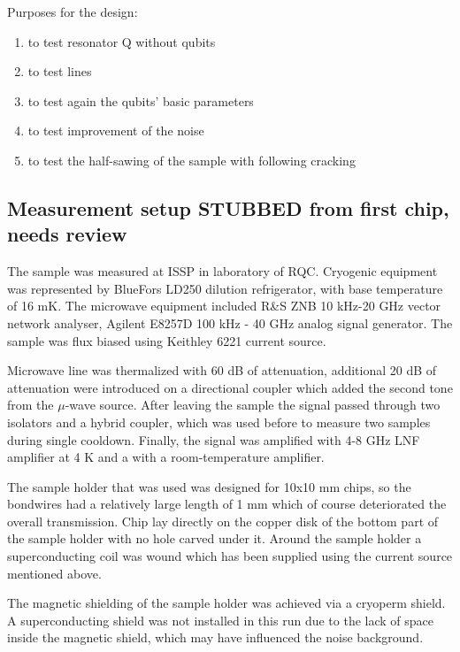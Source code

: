 \documentclass[12pt, twoside]{report}
\numberwithin{equation}{section}
\begin{document}
Purposes for the design:
\begin{enumerate}[label=(\alph*), leftmargin=1.5cm]
\itemsep0pt
\item to test resonator Q without qubits

\item to test lines

\item to test again the qubits' basic parameters

\item to test improvement of the noise

\item to test the half-sawing of the sample with following cracking
\end{enumerate}

\subsection{Measurement setup  STUBBED from first chip, needs review}

The sample was measured at ISSP in laboratory of RQC. Cryogenic equipment was represented by BlueFors LD250 dilution refrigerator, with base temperature of 16 mK. The microwave equipment included R\&S ZNB 10 kHz-20 GHz vector network analyser,  Agilent E8257D 100 kHz - 40 GHz analog signal generator. The sample was flux biased using Keithley 6221 current source.

Microwave line was thermalized with 60 dB of attenuation, additional 20 dB of attenuation were introduced on a directional coupler which added the second tone from the $\mu$-wave source. After leaving the sample the signal passed through two isolators and a hybrid coupler, which was used before to measure two samples during single cooldown. Finally, the signal was amplified with 4-8 GHz LNF amplifier at 4 K and a with a room-temperature amplifier.

The sample holder that was used was designed for 10x10 mm chips, so the bondwires had a relatively large length of 1 mm which of course deteriorated the overall transmission. Chip lay directly on the copper disk of the bottom part of the sample holder with no hole carved under it. Around the sample holder a superconducting coil was wound which has been supplied using the current source mentioned above.

The magnetic shielding of the sample holder was achieved via a cryoperm shield. A superconducting shield was not installed in this run due to the lack of space inside the magnetic shield, which may have influenced the noise background.
\end{document}
